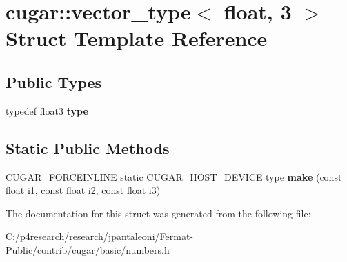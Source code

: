 \hypertarget{structcugar_1_1vector__type_3_01float_00_013_01_4}{}\section{cugar\+:\+:vector\+\_\+type$<$ float, 3 $>$ Struct Template Reference}
\label{structcugar_1_1vector__type_3_01float_00_013_01_4}
\subsection*{Public Types}
\begin{DoxyCompactItemize}
\item 
\mbox{\label{structcugar_1_1vector__type_3_01float_00_013_01_4_a356b2437dcfa4b54ea1e92105c5c1351}} 
typedef float3 {\bfseries type}
\end{DoxyCompactItemize}
\subsection*{Static Public Methods}
\begin{DoxyCompactItemize}
\item 
\mbox{\label{structcugar_1_1vector__type_3_01float_00_013_01_4_aad88112c786016883bcddd6b00536292}} 
C\+U\+G\+A\+R\+\_\+\+F\+O\+R\+C\+E\+I\+N\+L\+I\+NE static C\+U\+G\+A\+R\+\_\+\+H\+O\+S\+T\+\_\+\+D\+E\+V\+I\+CE type {\bfseries make} (const float i1, const float i2, const float i3)
\end{DoxyCompactItemize}


The documentation for this struct was generated from the following file\+:\begin{DoxyCompactItemize}
\item 
C\+:/p4research/research/jpantaleoni/\+Fermat-\/\+Public/contrib/cugar/basic/numbers.\+h\end{DoxyCompactItemize}
